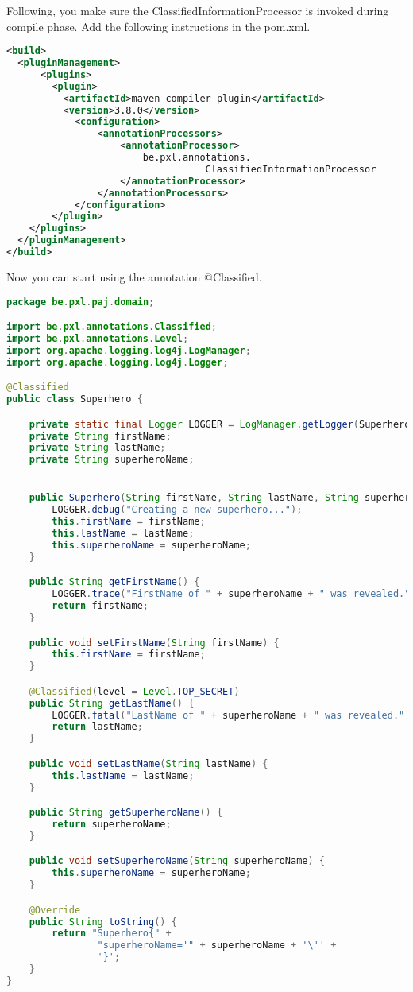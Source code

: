 Following, you make sure the ClassifiedInformationProcessor is invoked during compile phase. Add the following instructions in the pom.xml.

\begin{lstlisting}[frame=single, language=xml]
<build>
  <pluginManagement>
      <plugins>
        <plugin>
          <artifactId>maven-compiler-plugin</artifactId>
          <version>3.8.0</version>
	        <configuration>
		        <annotationProcessors>
			        <annotationProcessor>
				        be.pxl.annotations.
				                   ClassifiedInformationProcessor
			        </annotationProcessor>
		        </annotationProcessors>
	        </configuration>
        </plugin>
    </plugins>
  </pluginManagement>
</build>
\end{lstlisting}

Now you can start using the annotation @Classified.


\begin{lstlisting}[frame=single,language=java]
package be.pxl.paj.domain;

import be.pxl.annotations.Classified;
import be.pxl.annotations.Level;
import org.apache.logging.log4j.LogManager;
import org.apache.logging.log4j.Logger;

@Classified
public class Superhero {

	private static final Logger LOGGER = LogManager.getLogger(Superhero.class);
	private String firstName;
	private String lastName;
	private String superheroName;


	public Superhero(String firstName, String lastName, String superheroName) {
		LOGGER.debug("Creating a new superhero...");
		this.firstName = firstName;
		this.lastName = lastName;
		this.superheroName = superheroName;
	}

	public String getFirstName() {
		LOGGER.trace("FirstName of " + superheroName + " was revealed.");
		return firstName;
	}

	public void setFirstName(String firstName) {
		this.firstName = firstName;
	}

	@Classified(level = Level.TOP_SECRET)
	public String getLastName() {
		LOGGER.fatal("LastName of " + superheroName + " was revealed.");
		return lastName;
	}

	public void setLastName(String lastName) {
		this.lastName = lastName;
	}

	public String getSuperheroName() {
		return superheroName;
	}

	public void setSuperheroName(String superheroName) {
		this.superheroName = superheroName;
	}

	@Override
	public String toString() {
		return "Superhero{" +
				"superheroName='" + superheroName + '\'' +
				'}';
	}
}
\end{lstlisting}

